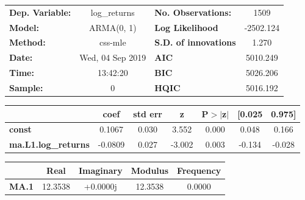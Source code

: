 \begin{center}
\begin{tabular}{lclc}
\toprule
\textbf{Dep. Variable:}     &        log\_returns       & \textbf{  No. Observations:  } &            1509            \\
\textbf{Model:}             &         ARMA(0, 1)        & \textbf{  Log Likelihood     } &         -2502.124          \\
\textbf{Method:}            &          css-mle          & \textbf{  S.D. of innovations} &           1.270            \\
\textbf{Date:}              &      Wed, 04 Sep 2019     & \textbf{  AIC                } &          5010.249          \\
\textbf{Time:}              &          13:42:20         & \textbf{  BIC                } &          5026.206          \\
\textbf{Sample:}            &             0             & \textbf{  HQIC               } &          5016.192          \\
\bottomrule
\end{tabular}
\begin{tabular}{lcccccc}
                            & \textbf{coef} & \textbf{std err} & \textbf{z} & \textbf{P$> |$z$|$} & \textbf{[0.025} & \textbf{0.975]}  \\
\midrule
\textbf{const}              &       0.1067  &        0.030     &     3.552  &         0.000        &        0.048    &        0.166     \\
\textbf{ma.L1.log\_returns} &      -0.0809  &        0.027     &    -3.002  &         0.003        &       -0.134    &       -0.028     \\
\bottomrule
\end{tabular}
\begin{tabular}{lcccc}
              & \textbf{            Real} & \textbf{         Imaginary} & \textbf{         Modulus} & \textbf{        Frequency}  \\
\midrule
\textbf{MA.1} &               12.3538     &                +0.0000j     &               12.3538     &                0.0000       \\
\bottomrule
\end{tabular}
\end{center}
